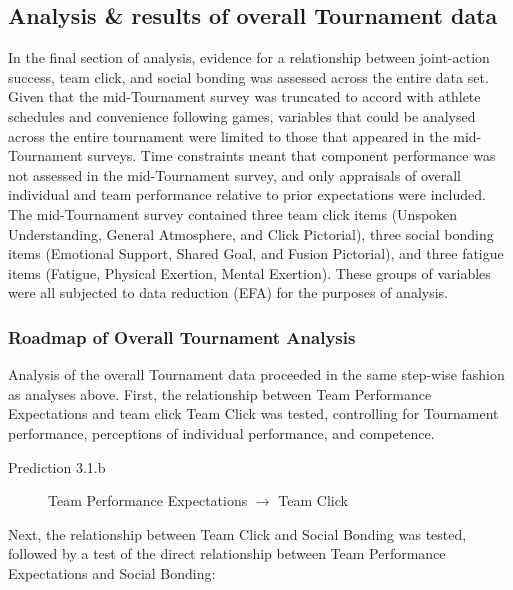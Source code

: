 \subsection{Analysis \& results of overall Tournament data}

In the final section of analysis, evidence for a relationship between joint-action success, team click, and social bonding was assessed across the entire data set. Given that the mid-Tournament survey was truncated to accord with athlete schedules and convenience following games, variables that could be analysed across the entire tournament were limited to those that appeared in the mid-Tournament surveys. Time constraints meant that component performance was not assessed in the mid-Tournament survey, and only appraisals of overall individual and team performance relative to prior expectations were included. The mid-Tournament survey contained three team click items (Unspoken Understanding, General Atmosphere, and Click Pictorial), three social bonding items (Emotional Support, Shared Goal, and Fusion Pictorial), and three fatigue items (Fatigue, Physical Exertion, Mental Exertion). These groups of variables were all subjected to data reduction (EFA) for the purposes of analysis.



\subsubsection{Roadmap of Overall Tournament Analysis}
Analysis of the overall Tournament data proceeded in the same step-wise fashion as analyses above. First, the relationship between Team Performance Expectations and team click Team Click was tested, controlling for Tournament performance, perceptions of individual performance, and competence.

\begin{description}
  \item [Prediction 3.1.b] Team Performance Expectations $\rightarrow$ Team Click
\end{description}

Next, the relationship between Team Click and Social Bonding was tested, followed by a test of the direct relationship between Team Performance Expectations and Social Bonding:

